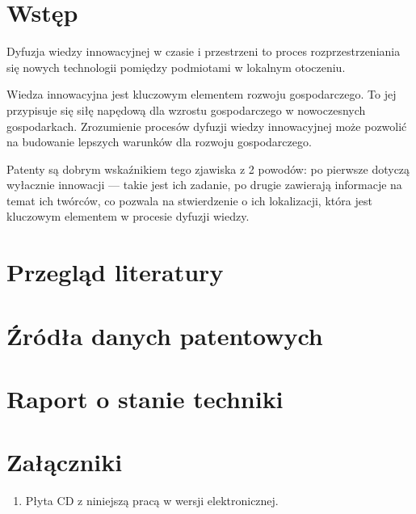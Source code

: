\documentclass[12pt, withmarginpar]{mwbk}
\begin{document}


\tableofcontents

\chapter*{Wstęp}

Dyfuzja wiedzy innowacyjnej w czasie i przestrzeni to proces
rozprzestrzeniania się nowych technologii pomiędzy podmiotami
w lokalnym otoczeniu.

Wiedza innowacyjna jest kluczowym elementem rozwoju gospodarczego.
To jej przypisuje się siłę napędową dla wzrostu gospodarczego
w nowoczesnych gospodarkach. Zrozumienie procesów dyfuzji 
wiedzy innowacyjnej może pozwolić na budowanie lepszych 
warunków dla rozwoju gospodarczego.

Patenty są dobrym wskaźnikiem tego zjawiska z 2 powodów:
po pierwsze dotyczą wyłacznie innowacji --- takie jest ich zadanie,
po drugie zawierają informacje na temat ich twórców, co pozwala
na stwierdzenie o ich lokalizacji, która jest kluczowym elementem
w procesie dyfuzji wiedzy.


\chapter{Przegląd literatury}\label{ch:intro}



\chapter{Źródła danych patentowych}\label{ch:data}









\chapter{Raport o stanie techniki}\label{ch:data}







\listoffigures

\listoftables

\chapter*{Załączniki}
\begin{enumerate}
\item Płyta CD z niniejszą pracą w wersji elektronicznej.
\end{enumerate}
\end{document}
